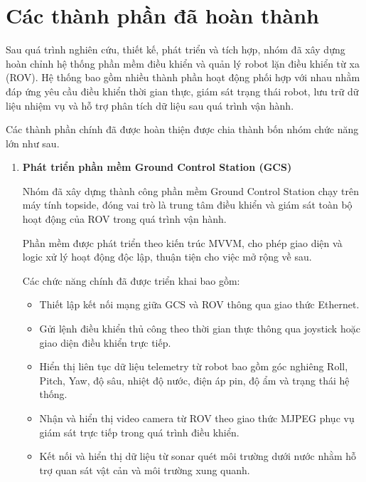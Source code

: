 \documentclass[../DoAn.tex]{subfiles}
\begin{document}
\section{Các thành phần đã hoàn thành}

Sau quá trình nghiên cứu, thiết kế, phát triển và tích hợp, nhóm đã xây dựng hoàn chỉnh hệ thống phần mềm điều khiển và quản lý robot lặn điều khiển từ xa (ROV). Hệ thống bao gồm nhiều thành phần hoạt động phối hợp với nhau nhằm đáp ứng yêu cầu điều khiển thời gian thực, giám sát trạng thái robot, lưu trữ dữ liệu nhiệm vụ và hỗ trợ phân tích dữ liệu sau quá trình vận hành.

Các thành phần chính đã được hoàn thiện được chia thành bốn nhóm chức năng lớn như sau.

\begin{enumerate}

\item \textbf{Phát triển phần mềm Ground Control Station (GCS)}

Nhóm đã xây dựng thành công phần mềm Ground Control Station chạy trên máy tính topside, đóng vai trò là trung tâm điều khiển và giám sát toàn bộ hoạt động của ROV trong quá trình vận hành.

Phần mềm được phát triển theo kiến trúc MVVM, cho phép giao diện và logic xử lý hoạt động độc lập, thuận tiện cho việc mở rộng về sau.

Các chức năng chính đã được triển khai bao gồm:

\begin{itemize}
    \item Thiết lập kết nối mạng giữa GCS và ROV thông qua giao thức Ethernet.
    
    \item Gửi lệnh điều khiển thủ công theo thời gian thực thông qua joystick hoặc giao diện điều khiển trực tiếp.
    
    \item Hiển thị liên tục dữ liệu telemetry từ robot bao gồm góc nghiêng Roll, Pitch, Yaw, độ sâu, nhiệt độ nước, điện áp pin, độ ẩm và trạng thái hệ thống.
    
    \item Nhận và hiển thị video camera từ ROV theo giao thức MJPEG phục vụ giám sát trực tiếp trong quá trình điều khiển.
    
    \item Kết nối và hiển thị dữ liệu từ sonar quét môi trường dưới nước nhằm hỗ trợ quan sát vật cản và môi trường xung quanh.
    

\end{itemize}
\end{enumerate}
\end{document}
